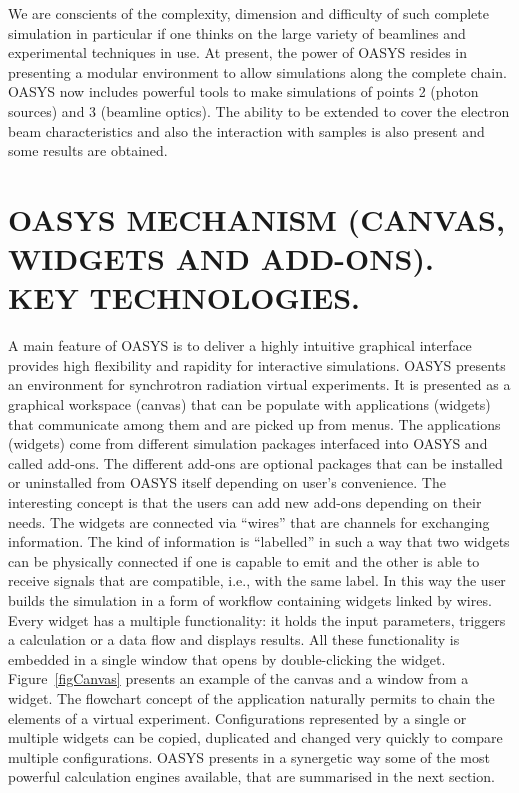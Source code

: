 \documentclass{aip-cp}
\begin{document}
We are conscients of the complexity, dimension and difficulty of such complete simulation in particular if one thinks on the large variety of beamlines and experimental techniques in use. At present, the power of OASYS resides in presenting a modular environment to allow simulations along the complete chain. OASYS now includes powerful tools to make simulations of points 2 (photon sources) and 3 (beamline optics). The ability to be extended to cover the electron beam characteristics and also the interaction with samples is also present and some results are obtained. 


\section{OASYS MECHANISM (CANVAS, WIDGETS AND ADD-ONS). KEY TECHNOLOGIES.}

A main feature of OASYS is to deliver a highly intuitive graphical interface provides high flexibility and rapidity for interactive simulations. OASYS presents an environment for synchrotron radiation virtual experiments. It is presented as a graphical workspace (canvas) that can be populate with applications (widgets) that communicate among them and are picked up from menus. The applications (widgets)  come from different simulation packages interfaced into OASYS and called add-ons. The different add-ons are optional packages that can be installed or uninstalled from OASYS itself depending on user's convenience. The interesting concept is that the users can add new add-ons depending on their needs. The widgets are connected via ``wires'' that are channels for exchanging information. The kind of information is ``labelled'' in such a way that two widgets can be physically connected if one is capable to emit and the other is able to receive signals that are compatible, i.e., with the same label. In this way the user builds the simulation in a form of workflow containing widgets linked by wires. Every widget has a multiple functionality: it holds the input parameters, triggers a calculation or a data flow and displays results. All these functionality is embedded in a single window that opens by double-clicking the widget. Figure~\ref{figCanvas} presents an example of the canvas and a window from a widget. 
The flowchart concept of the application naturally permits to chain the elements of a virtual experiment. Configurations represented by a single or multiple widgets can be copied, duplicated and changed very quickly to compare multiple configurations. OASYS presents in a synergetic way some of the most powerful calculation engines available, that are summarised in the next section. 
\end{document}
